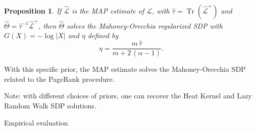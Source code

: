 \documentclass[xcolor=dvipsnames]{beamer}
\DeclareMathOperator{\Tr}{Tr}
\newtheorem{proposition}[theorem]{Proposition}
\begin{document}
\begin{frame}
  \begin{proposition}\label{P:map-sdp}
    If $\mathcal{\hat L}$ is the MAP estimate of $\mathcal{L}$, with
    $\hat \tau = \Tr(\mathcal{\hat L}^+)$ and
    $\hat \Theta = \hat \tau^{-1} \mathcal{\hat L}^+$,
    then $\hat \Theta$ solves
    the Mahoney-Orecchia regularized SDP with $G(X) = -\log |X|$ and
    $\eta$ defined by
    \[
      \eta = \frac{m \, \hat \tau}{m + 2\,(\alpha - 1)}.
    \]
  \end{proposition}
 
  With this specific prior, the MAP estimate solves the Mahoney-Orecchia SDP
  related to the PageRank procedure.  

  Note: with different choices of priors, one can recover the Heat Kernel 
  and Lazy Random Walk SDP solutions.
\end{frame}

\begin{frame}[c]
  \begin{block}{}
  \begin{center}
    \huge{Empirical evaluation}
  \end{center}
  \end{block}
\end{frame}
\end{document}
